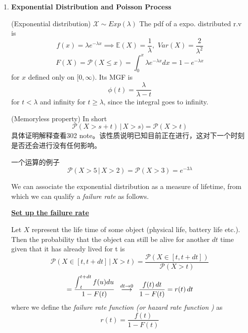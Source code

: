 \documentclass[10.5pt]{article}
\def\scaleint#1{\vcenter{\hbox{\scaleto[4ex]{\displaystyle\int}{#1}}}}
\newcommand{\prob}[0]{\mathcal{P}}
\newcommand{\expt}[0]{\mathbb{E}}
\newenvironment{changemargin}[2]{%
  \begin{list}{}{%
    \setlength{\topsep}{0pt}%
    \setlength{\leftmargin}{#1}%
    \setlength{\rightmargin}{#2}%
    \setlength{\listparindent}{\parindent}%
    \setlength{\itemindent}{\parindent}%
    \setlength{\parsep}{\parskip}%
  }%
  \item[]}{\end{list}}
\begin{document}
\begin{changemargin}{-0.125in}{0in}
\begin{enumerate}
            \bigskip
            
            \item \textbf{Exponential Distribution and Poisson Process}
            
            \smallskip
            
            \begin{definition}
            	(Exponential distribution) $\mathcal{X} \sim Exp(\lambda)$ The pdf of a expo. distributed r.v is 
            	\[
            	f(x) = \lambda e^{-\lambda x}\implies \expt(X) = \frac{1}{\lambda},\,\,Var(X) = \frac{2}{\lambda^2}
            	\]
            	\[
            	F(X) = \prob(X \leq x) = \int^x_0 \lambda e^{-\lambda x} dx = 1 - e^{-\lambda x}
            	\]
            	for $x$ defined only on $[0,\infty)$. Its MGF is 
            	\[
            	\phi(t) = \frac{\lambda}{\lambda - t} 
            	\]
            	for $t < \lambda$ and infinity for $t \geq \lambda$, since the integral goes to infinity. 
            \end{definition}
            
            \smallskip
            
            \begin{proposition}
            	(Memoryless property) In short 
            	\[
            	\prob(X > s+t)\,|\,X > s) = \prob(X>t)
            	\]
            	具体证明解释查看302 note。该性质说明已知目前正在进行，这对下一个时刻是否还会进行没有任何影响。            \end{proposition}
      
                 一个运算的例子
            	\[
            	  \prob(X>5\,|\,X>2) = \prob(X>3) = e^{-3 \lambda}
            	\]
            	
            	
            	
            	\begin{remark}
            		We can associate the exponential distribution as a measure of lifetime, from which we can qualify a \textit{failure rate} as follows.
            		\end{remark}
            		
            		\medskip
            		
            		\underline{\textbf{Set up the failure rate}}
            		
            		\smallskip
            		
            		Let $X$ represent the life time of some object (physical life, battery life etc.). Then the probability that the object can still be alive for another $dt$ time given that it has already lived for t is 
            		\[
            		\prob(X \in [t, t+dt]\,|\,X>t) = \frac{\prob(X\in [t, t+dt])}{\prob(X>t)}
            		\]
            		\[
            		 = \frac{\scaleint{4ex}^{t+dt}_t \,f(u)du}{1 - F(t)} \,\,\,\overset{dt \rightarrow 0}{\longrightarrow}\,\,\, \frac{f(t) \,dt}{1 - F(t)} = r(t) \,dt
            		\]
            		where we define the \textit{failure rate function (or hazard rate function )} as 
            		\[
            		r(t) = \frac{f(t)}{1 - F(t)}
            		\]
            		

\end{enumerate}
\end{changemargin}
\end{document}
